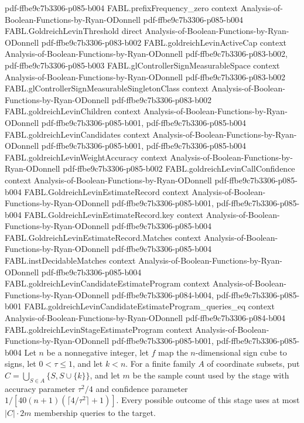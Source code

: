 \begin{theorem}
  {pdf-ffbe9c7b3306-p085-b004}
\proofstep
  {FABL.prefixFrequency_zero}
  {context}
  {Analysis-of-Boolean-Functions-by-Ryan-ODonnell}
  {pdf-ffbe9c7b3306-p085-b004}
\proofstep
  {FABL.GoldreichLevinThreshold}
  {direct}
  {Analysis-of-Boolean-Functions-by-Ryan-ODonnell}
  {pdf-ffbe9c7b3306-p083-b002}
\proofstep
  {FABL.goldreichLevinActiveCap}
  {context}
  {Analysis-of-Boolean-Functions-by-Ryan-ODonnell}
  {pdf-ffbe9c7b3306-p083-b002,
    pdf-ffbe9c7b3306-p085-b003}
\proofstep
  {FABL.glControllerSignMeasurableSpace}
  {context}
  {Analysis-of-Boolean-Functions-by-Ryan-ODonnell}
  {pdf-ffbe9c7b3306-p083-b002}
\proofstep
  {FABL.glControllerSignMeasurableSingletonClass}
  {context}
  {Analysis-of-Boolean-Functions-by-Ryan-ODonnell}
  {pdf-ffbe9c7b3306-p083-b002}
\proofstep
  {FABL.goldreichLevinChildren}
  {context}
  {Analysis-of-Boolean-Functions-by-Ryan-ODonnell}
  {pdf-ffbe9c7b3306-p085-b001,
    pdf-ffbe9c7b3306-p085-b004}
\proofstep
  {FABL.goldreichLevinCandidates}
  {context}
  {Analysis-of-Boolean-Functions-by-Ryan-ODonnell}
  {pdf-ffbe9c7b3306-p085-b001,
    pdf-ffbe9c7b3306-p085-b004}
\proofstep
  {FABL.goldreichLevinWeightAccuracy}
  {context}
  {Analysis-of-Boolean-Functions-by-Ryan-ODonnell}
  {pdf-ffbe9c7b3306-p085-b002}
\proofstep
  {FABL.goldreichLevinCallConfidence}
  {context}
  {Analysis-of-Boolean-Functions-by-Ryan-ODonnell}
  {pdf-ffbe9c7b3306-p085-b004}
\proofstep
  {FABL.GoldreichLevinEstimateRecord}
  {context}
  {Analysis-of-Boolean-Functions-by-Ryan-ODonnell}
  {pdf-ffbe9c7b3306-p085-b001,
    pdf-ffbe9c7b3306-p085-b004}
\proofstep
  {FABL.GoldreichLevinEstimateRecord.key}
  {context}
  {Analysis-of-Boolean-Functions-by-Ryan-ODonnell}
  {pdf-ffbe9c7b3306-p085-b004}
\proofstep
  {FABL.GoldreichLevinEstimateRecord.Matches}
  {context}
  {Analysis-of-Boolean-Functions-by-Ryan-ODonnell}
  {pdf-ffbe9c7b3306-p085-b004}
\proofstep
  {FABL.instDecidableMatches}
  {context}
  {Analysis-of-Boolean-Functions-by-Ryan-ODonnell}
  {pdf-ffbe9c7b3306-p085-b004}
\proofstep
  {FABL.goldreichLevinCandidateEstimateProgram}
  {context}
  {Analysis-of-Boolean-Functions-by-Ryan-ODonnell}
  {pdf-ffbe9c7b3306-p084-b004,
    pdf-ffbe9c7b3306-p085-b001}
\proofstep
  {FABL.goldreichLevinCandidateEstimateProgram_queries_eq}
  {context}
  {Analysis-of-Boolean-Functions-by-Ryan-ODonnell}
  {pdf-ffbe9c7b3306-p084-b004}
\proofstep
  {FABL.goldreichLevinStageEstimateProgram}
  {context}
  {Analysis-of-Boolean-Functions-by-Ryan-ODonnell}
  {pdf-ffbe9c7b3306-p085-b001,
    pdf-ffbe9c7b3306-p085-b004}
Let $n$ be a nonnegative integer, let $f$ map the $n$-dimensional sign cube to signs,
let $0<\tau\le1$, and let $k<n$. For a finite family $A$ of coordinate subsets, put
$C=\bigcup_{S\in A}\{S,S\cup\{k\}\}$, and let $m$ be the sample count used by the
stage with accuracy parameter $\tau^2/4$ and confidence parameter
$1/[40(n+1)(\lceil4/\tau^2\rceil+1)]$. Every possible outcome of this stage uses at
most $|C|\cdot 2m$ membership queries to the target.
\end{theorem}

